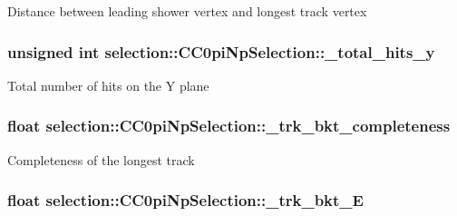 Distance between leading shower vertex and longest track vertex \hypertarget{classselection_1_1CC0piNpSelection_a819d1d973e74bcd2ad82aa01ea24ac37}{
\subsubsection[{\-\_\-total\-\_\-hits\-\_\-y}]{\setlength{\rightskip}{0pt plus 5cm}unsigned int selection\-::\-C\-C0pi\-Np\-Selection\-::\-\_\-total\-\_\-hits\-\_\-y\hspace{0.3cm}{\ttfamily [private]}}}\label{classselection_1_1CC0piNpSelection_a819d1d973e74bcd2ad82aa01ea24ac37}
Total number of hits on the Y plane \hypertarget{classselection_1_1CC0piNpSelection_aab22ce289e2d4a109440369e30fddf52}{
\subsubsection[{\-\_\-trk\-\_\-bkt\-\_\-completeness}]{\setlength{\rightskip}{0pt plus 5cm}float selection\-::\-C\-C0pi\-Np\-Selection\-::\-\_\-trk\-\_\-bkt\-\_\-completeness\hspace{0.3cm}{\ttfamily [private]}}}\label{classselection_1_1CC0piNpSelection_aab22ce289e2d4a109440369e30fddf52}
Completeness of the longest track \hypertarget{classselection_1_1CC0piNpSelection_aa7a6076f1169185e0b2b02fbb03aba22}{
\subsubsection[{\-\_\-trk\-\_\-bkt\-\_\-\-E}]{\setlength{\rightskip}{0pt plus 5cm}float selection\-::\-C\-C0pi\-Np\-Selection\-::\-\_\-trk\-\_\-bkt\-\_\-\-E\hspace{0.3cm}{\ttfamily [private]}}}\label{classselection_1_1CC0piNpSelection_aa7a6076f1169185e0b2b02fbb03aba22}
